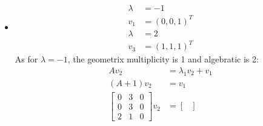 \documentclass{article}
\begin{document}
\begin{itemize}
\begin{itemize}
\begin{align*}
\begin{matrix}
                0&3&0\\
                2&1&0
            \end{matrix}\right)v&=0\\
            (A-2\ \text{id})v&=0\\
            v&=\begin{pmatrix}
                0\\0\\s
            \end{pmatrix}\\
            \left(\begin{matrix}
                -3&3&0\\
                0&0&0\\
                2&1&-3
            \end{matrix}\right)v&=0\\
            v&=\begin{pmatrix}
                s\\s\\s
            \end{pmatrix}\\
            J_A&=\begin{bmatrix}
                -1&1&0\\
                0&-1&0\\
                0&0&2
            \end{bmatrix}
        \end{align*}
        \item [b)]
        \begin{align*}
            \lambda&=-1\\
            v_1&=(0,0,1)^T\\
            \lambda&=2\\
            v_3&=(1,1,1)^T
        \end{align*}
        As for \(\lambda=-1\), the geometrix multiplicity is 1 and algebratic is 2:
        \begin{align*}
            Av_2&=\lambda_1v_2+v_1\\
            (A+1)v_2&=v_1\\
            \begin{bmatrix}
                0&3&0\\
                0&3&0\\
                2&1&0
            \end{bmatrix}v_2&=\begin{bmatrix}

\end{bmatrix}
\end{align*}
\end{itemize}
\end{itemize}
\end{document}
